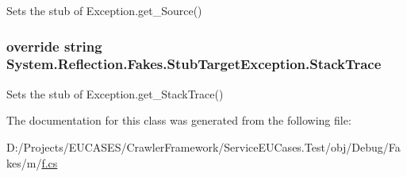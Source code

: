 Sets the stub of Exception.\-get\-\_\-\-Source()

\hypertarget{class_system_1_1_reflection_1_1_fakes_1_1_stub_target_exception_a772fc0435363179cf29b35a6b93b4377}{
\subsubsection[{Stack\-Trace}]{\setlength{\rightskip}{0pt plus 5cm}override string System.\-Reflection.\-Fakes.\-Stub\-Target\-Exception.\-Stack\-Trace\hspace{0.3cm}{\ttfamily [get]}}}\label{class_system_1_1_reflection_1_1_fakes_1_1_stub_target_exception_a772fc0435363179cf29b35a6b93b4377}


Sets the stub of Exception.\-get\-\_\-\-Stack\-Trace()



The documentation for this class was generated from the following file\-:\begin{DoxyCompactItemize}
\item 
D\-:/\-Projects/\-E\-U\-C\-A\-S\-E\-S/\-Crawler\-Framework/\-Service\-E\-U\-Cases.\-Test/obj/\-Debug/\-Fakes/m/\hyperlink{m_2f_8cs}{f.\-cs}\end{DoxyCompactItemize}
